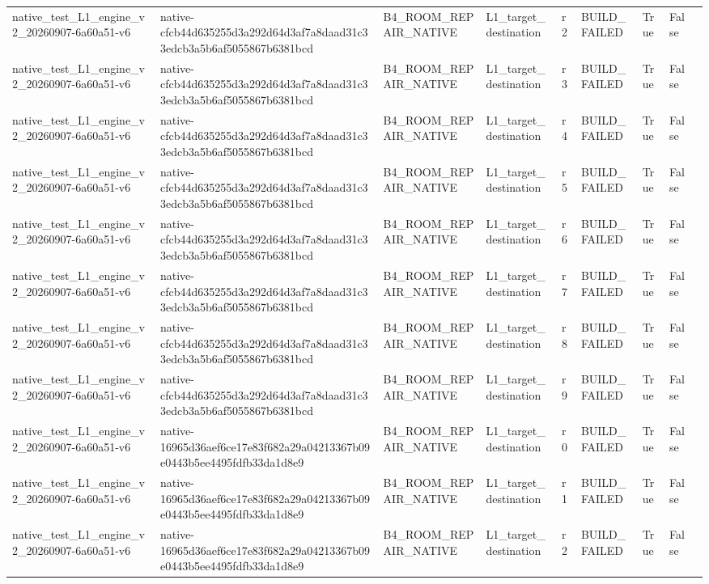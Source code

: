 \begin{tabular}{lllllllll}
native\_test\_L1\_engine\_v2\_20260907-6a60a51-v6 & native-cfcb44d635255d3a292d64d3af7a8daad31c33edcb3a5b6af5055867b6381bcd & B4\_ROOM\_REPAIR\_NATIVE & L1\_target\_destination & r2 & BUILD\_FAILED & True & False &  \\
native\_test\_L1\_engine\_v2\_20260907-6a60a51-v6 & native-cfcb44d635255d3a292d64d3af7a8daad31c33edcb3a5b6af5055867b6381bcd & B4\_ROOM\_REPAIR\_NATIVE & L1\_target\_destination & r3 & BUILD\_FAILED & True & False &  \\
native\_test\_L1\_engine\_v2\_20260907-6a60a51-v6 & native-cfcb44d635255d3a292d64d3af7a8daad31c33edcb3a5b6af5055867b6381bcd & B4\_ROOM\_REPAIR\_NATIVE & L1\_target\_destination & r4 & BUILD\_FAILED & True & False &  \\
native\_test\_L1\_engine\_v2\_20260907-6a60a51-v6 & native-cfcb44d635255d3a292d64d3af7a8daad31c33edcb3a5b6af5055867b6381bcd & B4\_ROOM\_REPAIR\_NATIVE & L1\_target\_destination & r5 & BUILD\_FAILED & True & False &  \\
native\_test\_L1\_engine\_v2\_20260907-6a60a51-v6 & native-cfcb44d635255d3a292d64d3af7a8daad31c33edcb3a5b6af5055867b6381bcd & B4\_ROOM\_REPAIR\_NATIVE & L1\_target\_destination & r6 & BUILD\_FAILED & True & False &  \\
native\_test\_L1\_engine\_v2\_20260907-6a60a51-v6 & native-cfcb44d635255d3a292d64d3af7a8daad31c33edcb3a5b6af5055867b6381bcd & B4\_ROOM\_REPAIR\_NATIVE & L1\_target\_destination & r7 & BUILD\_FAILED & True & False &  \\
native\_test\_L1\_engine\_v2\_20260907-6a60a51-v6 & native-cfcb44d635255d3a292d64d3af7a8daad31c33edcb3a5b6af5055867b6381bcd & B4\_ROOM\_REPAIR\_NATIVE & L1\_target\_destination & r8 & BUILD\_FAILED & True & False &  \\
native\_test\_L1\_engine\_v2\_20260907-6a60a51-v6 & native-cfcb44d635255d3a292d64d3af7a8daad31c33edcb3a5b6af5055867b6381bcd & B4\_ROOM\_REPAIR\_NATIVE & L1\_target\_destination & r9 & BUILD\_FAILED & True & False &  \\
native\_test\_L1\_engine\_v2\_20260907-6a60a51-v6 & native-16965d36aef6ce17e83f682a29a04213367b09e0443b5ee4495fdfb33da1d8e9 & B4\_ROOM\_REPAIR\_NATIVE & L1\_target\_destination & r0 & BUILD\_FAILED & True & False &  \\
native\_test\_L1\_engine\_v2\_20260907-6a60a51-v6 & native-16965d36aef6ce17e83f682a29a04213367b09e0443b5ee4495fdfb33da1d8e9 & B4\_ROOM\_REPAIR\_NATIVE & L1\_target\_destination & r1 & BUILD\_FAILED & True & False &  \\
native\_test\_L1\_engine\_v2\_20260907-6a60a51-v6 & native-16965d36aef6ce17e83f682a29a04213367b09e0443b5ee4495fdfb33da1d8e9 & B4\_ROOM\_REPAIR\_NATIVE & L1\_target\_destination & r2 & BUILD\_FAILED & True & False &  \\

\end{tabular}
